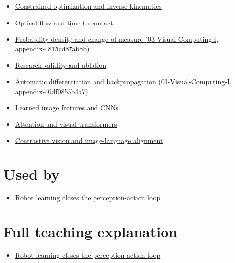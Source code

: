 \begin{itemize}
\tightlist
\item
  \hyperref[appendix-29f4bea4c2bb]{Constrained optimization and inverse kinematics}
\item
  \hyperref[appendix-e2e73f8cd93e]{Optical flow and time to contact}
\item
  \href{../03-Visual-Computing-I/main.pdf\#nameddest=appendix-4815cd87ab8b}{Probability density and change of measure (03-Visual-Computing-I, appendix-4815cd87ab8b)}
\item
  \hyperref[appendix-65788587ef78]{Research validity and ablation}
\item
  \href{../03-Visual-Computing-I/main.pdf\#nameddest=appendix-40df0855b4a7}{Automatic differentiation and backpropagation (03-Visual-Computing-I, appendix-40df0855b4a7)}
\item
  \hyperref[appendix-47c51ea026fb]{Learned image features and CNNs}
\item
  \hyperref[appendix-a9d5dfdd164a]{Attention and visual transformers}
\item
  \hyperref[appendix-772f1fd96148]{Contrastive vision and image-language alignment}
\end{itemize}

\section{Used by}\label{appendix-b0c42da325f1-used-by}

\begin{itemize}
\tightlist
\item
  \href{Continuous\%20Notes/University\%20-\%20Worlds,\%20Images\%20and\%20Inference\%20-\%20Graphics,\%20Vision\%20and\%20Photography\#Robot\%20learning\%20closes\%20the\%20perception-action\%20loop}{Robot learning closes the perception-action loop}
\end{itemize}

\section{Full teaching explanation}\label{appendix-b0c42da325f1-full-teaching-explanation}

\begin{itemize}
\tightlist
\item
  \href{Continuous\%20Notes/University\%20-\%20Worlds,\%20Images\%20and\%20Inference\%20-\%20Graphics,\%20Vision\%20and\%20Photography\#Robot\%20learning\%20closes\%20the\%20perception-action\%20loop}{Robot learning closes the perception-action loop}
\end{itemize}

